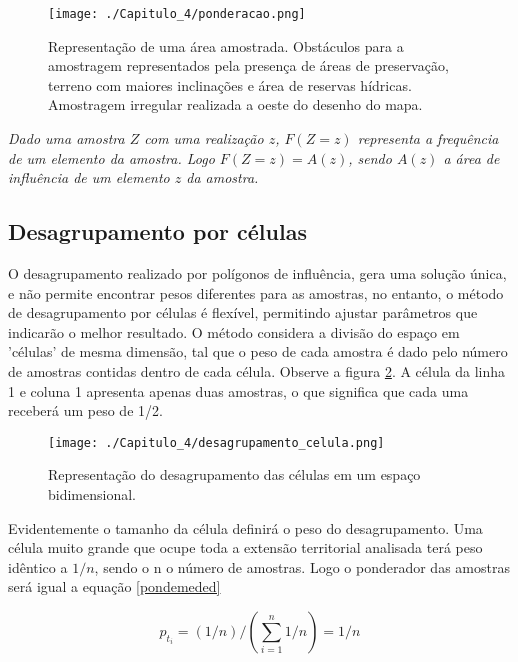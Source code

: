 \FloatBarrier
\begin{figure}[!htpb]
	\centering
	\texttt{[image: ./Capitulo\_4/ponderacao.png]}	
	\caption{Representação de uma área amostrada. Obstáculos para a amostragem representados pela presença de áreas de preservação, terreno com maiores inclinações e área de reservas hídricas. Amostragem irregular realizada a oeste do desenho do mapa.}
	\label{tissen_hist}
\end{figure}
\FloatBarrier 

\begin{definition}
	\textit{Dado uma amostra $Z$ com uma realização $z$,  $F(Z=z)$ representa a frequência de um elemento da amostra. Logo $F(Z=z) = A(z)$, sendo $A(z)$ a área de influência de um elemento $z$ da amostra. }  
\end{definition}

\subsection{Desagrupamento por células} 

O desagrupamento realizado por polígonos de influência, gera uma solução única, e não permite encontrar pesos diferentes para as amostras, no entanto, o método de desagrupamento por células é flexível, permitindo ajustar parâmetros que indicarão o melhor resultado. O método considera a divisão do espaço em 'células' de mesma dimensão, tal que  o peso de cada amostra é dado pelo número de amostras contidas dentro de cada célula. Observe a figura \ref{cel_declus}. A célula da linha 1 e coluna 1 apresenta apenas duas amostras, o que significa que cada uma receberá um peso de 1/2. 

\FloatBarrier
\begin{figure}[!htpb]
	\centering
	\texttt{[image: ./Capitulo\_4/desagrupamento\_celula.png]}	
	\caption{Representação do desagrupamento das células em um espaço bidimensional.}
	\label{cel_declus}
\end{figure}
\FloatBarrier 

Evidentemente o tamanho da célula definirá o peso do desagrupamento. Uma célula muito grande que ocupe toda a extensão territorial analisada terá peso idêntico a $1/n$, sendo o n o número de amostras. Logo o ponderador das amostras será igual a equação \ref{pondemeded} 

\begin{equation} \label{pondemeded} 
p_{t_{i}} = (1/n)/\left(\sum_{i=1}^{n}1/n\right) = 1/n
\end{equation}


